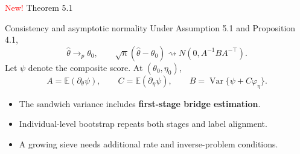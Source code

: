 \documentclass[aspectratio=169,10pt]{beamer}
\newcommand{\E}{\mathbb E}
\newenvironment{theorembox}[1]{\begin{block}{#1}}{\end{block}}
\begin{document}
\begin{frame}{\textcolor{Red}{New!} Theorem 5.1}
\begin{theorembox}{Consistency and asymptotic normality}
Under Assumption 5.1 and Proposition 4.1,
\[
\widehat\theta\to_p\theta_0,\qquad
\sqrt n(\widehat\theta-\theta_0)\rightsquigarrow N(0,A^{-1}BA^{-\top}).
\]
Let $\psi$ denote the composite score. At $(\theta_0,\eta_0)$,
\[
A=\E(\partial_\theta\psi),\qquad C=\E(\partial_\eta\psi),\qquad
B=\operatorname{Var}\{\psi+C\varphi_\eta\}.
\]
\end{theorembox}
\begin{itemize}
  \item The sandwich variance includes \textbf{first-stage bridge estimation}.
  \item Individual-level bootstrap repeats both stages and label alignment.
  \item A growing sieve needs additional rate and inverse-problem conditions.
\end{itemize}
\end{frame}
\end{document}
